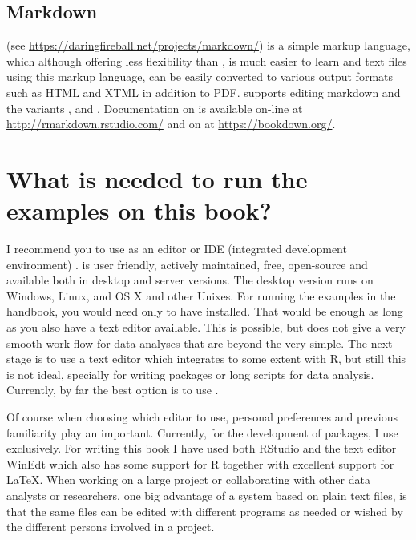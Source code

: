 \documentclass[krantz2,ChapterTOCs]{krantz}\usepackage{knitr}
\begin{document}
\subsection{Markdown}

 (see \url{https://daringfireball.net/projects/markdown/}) is a simple markup language, which although offering less flexibility than , is much easier to learn and text files using this markup language, can be easily converted to various output formats such as HTML and XTML in addition to PDF. \RStudio supports editing markdown and the variants ,  and . Documentation on  is available on-line at \url{http://rmarkdown.rstudio.com/} and on  at \url{https://bookdown.org/}.

\section{What is needed to run the examples on this book?}

I recommend you to use as an editor or IDE (integrated development environment) \RStudio. \RStudio is user friendly, actively maintained, free, open-source and available both in desktop and server versions. The desktop version runs on Windows, Linux, and OS X and other Unixes. For running the examples in the handbook, you would need only to have  installed. That would be enough as long as you also have a text editor available. This is possible, but does not give a very smooth work flow for data analyses that are beyond the very simple. The next stage is to use a text editor which integrates to some extent with R, but still this is not ideal, specially for writing packages or long scripts for data analysis. Currently, by far the best option is to use \RStudio.

Of course when choosing which editor to use, personal preferences and previous familiarity play an important.
Currently, for the development of packages, I use \RStudio exclusively. For writing this book I have used both RStudio and the text editor WinEdt which also has some support for R together with excellent support for \LaTeX. When working on a large project or collaborating with other data analysts or researchers, one big advantage of a system based on plain text files, is that the same files can be edited with different programs as needed or wished by the different persons involved in a project.
\end{document}
